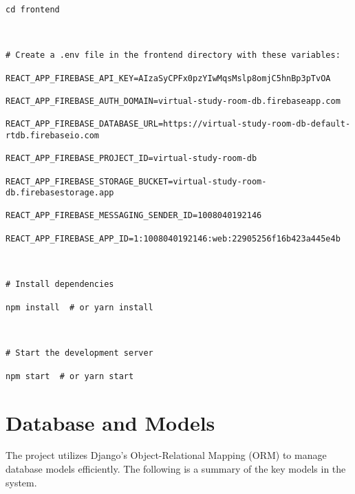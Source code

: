 \documentclass[a4paper,12pt]{article}
\begin{document}
\begin{verbatim}

cd frontend



# Create a .env file in the frontend directory with these variables:

REACT_APP_FIREBASE_API_KEY=AIzaSyCPFx0pzYIwMqsMslp8omjC5hnBp3pTvOA

REACT_APP_FIREBASE_AUTH_DOMAIN=virtual-study-room-db.firebaseapp.com

REACT_APP_FIREBASE_DATABASE_URL=https://virtual-study-room-db-default-rtdb.firebaseio.com

REACT_APP_FIREBASE_PROJECT_ID=virtual-study-room-db

REACT_APP_FIREBASE_STORAGE_BUCKET=virtual-study-room-db.firebasestorage.app

REACT_APP_FIREBASE_MESSAGING_SENDER_ID=1008040192146

REACT_APP_FIREBASE_APP_ID=1:1008040192146:web:22905256f16b423a445e4b



# Install dependencies

npm install  # or yarn install



# Start the development server

npm start  # or yarn start

\end{verbatim}



\section{Database and Models}



The project utilizes Django's Object-Relational Mapping (ORM) to manage database models efficiently. The following is a summary of the key models in the system.
\end{document}
